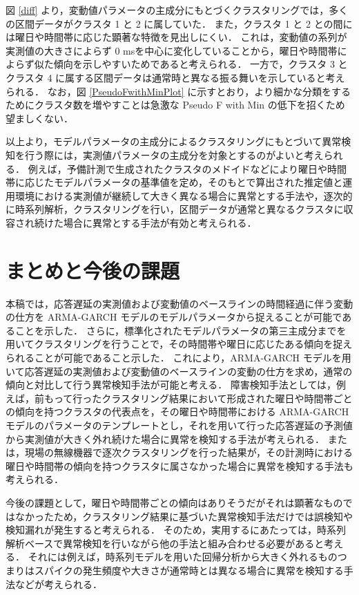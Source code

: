 \documentclass[technicalreport]{ieicej}
\begin{document}
図 \ref{diff} より，変動値パラメータの主成分にもとづくクラスタリングでは，多くの区間データがクラスタ 1 と 2 に属していた．
また，クラスタ 1 と 2 との間には曜日や時間帯に応じた顕著な特徴を見出しにくい．
これは，変動値の系列が実測値の大きさによらず 0 msを中心に変化していることから，曜日や時間帯によらず似た傾向を示しやすいためであると考えられる．
一方で，クラスタ 3 とクラスタ 4 に属する区間データは通常時と異なる振る舞いを示していると考えられる．
なお，図 \ref{PseudoFwithMinPlot} に示すとおり，より細かな分類をするためにクラスタ数を増やすことは急激な Pseudo F with Min の低下を招くため望ましくない．

以上より，モデルパラメータの主成分によるクラスタリングにもとづいて異常検知を行う際には，実測値パラメータの主成分を対象とするのがよいと考えられる．
例えば，予備計測で生成されたクラスタのメドイドなどにより曜日や時間帯に応じたモデルパラメータの基準値を定め，そのもとで算出された推定値と運用環境における実測値が継続して大きく異なる場合に異常とする手法や，逐次的に時系列解析，クラスタリングを行い，区間データが通常と異なるクラスタに収容され続けた場合に異常とする手法が有効と考えられる．
\section{まとめと今後の課題}
本稿では，応答遅延の実測値および変動値のベースラインの時間経過に伴う変動の仕方を ARMA-GARCH モデルのモデルパラメータから捉えることが可能であることを示した．
さらに，標準化されたモデルパラメータの第三主成分までを用いてクラスタリングを行うことで，その時間帯や曜日に応じたある傾向を捉えられることが可能であること示した．
これにより，ARMA-GARCH モデルを用いて応答遅延の実測値および変動値のベースラインの変動の仕方を求め，通常の傾向と対比して行う異常検知手法が可能と考える．
障害検知手法としては，例えば，前もって行ったクラスタリング結果において形成された曜日や時間帯ごとの傾向を持つクラスタの代表点を，その曜日や時間帯における ARMA-GARCH モデルのパラメータのテンプレートとし，それを用いて行った応答遅延の予測値から実測値が大きく外れ続けた場合に異常を検知する手法が考えられる．
または，現場の無線機器で逐次クラスタリングを行った結果が，その計測時における曜日や時間帯の傾向を持つクラスタに属さなかった場合に異常を検知する手法も考えられる．

今後の課題として，曜日や時間帯ごとの傾向はありそうだがそれは顕著なものではなかったため，クラスタリング結果に基づいた異常検知手法だけでは誤検知や検知漏れが発生すると考えられる．
そのため，実用するにあたっては，時系列解析ベースで異常検知を行いながら他の手法と組み合わせる必要があると考える．
それには例えば，時系列モデルを用いた回帰分析から大きく外れるものつまりはスパイクの発生頻度や大きさが通常時とは異なる場合に異常を検知する手法などが考えられる．



\end{document}
